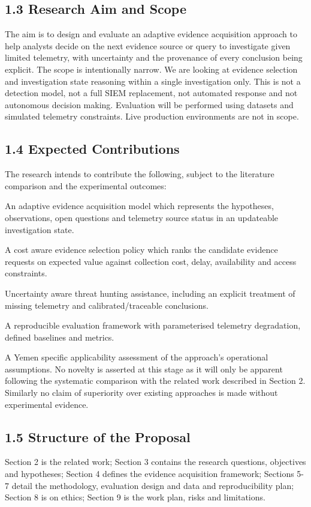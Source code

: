 \documentclass[a4paper,11pt]{article}
\begin{document}
\subsection{1.3 Research Aim and Scope}
The aim is to design and evaluate an adaptive evidence acquisition approach to help analysts decide on the next evidence source or query to investigate given limited telemetry, with uncertainty and the provenance of every conclusion being explicit. The scope is intentionally narrow. We are looking at evidence selection and investigation state reasoning within a single investigation only. This is not a detection model, not a full SIEM replacement, not automated response and not autonomous decision making. Evaluation will be performed using datasets and simulated telemetry constraints. Live production environments are not in scope.\par
\subsection{1.4 Expected Contributions}
The research intends to contribute the following, subject to the literature comparison and the experimental outcomes:\par
An adaptive evidence acquisition model which represents the hypotheses, observations, open questions and telemetry source status in an updateable investigation state.\par
A cost aware evidence selection policy which ranks the candidate evidence requests on expected value against collection cost, delay, availability and access constraints.\par
Uncertainty aware threat hunting assistance, including an explicit treatment of missing telemetry and calibrated/traceable conclusions.\par
A reproducible evaluation framework with parameterised telemetry degradation, defined baselines and metrics.\par
A Yemen specific applicability assessment of the approach's operational assumptions. No novelty is asserted at this stage as it will only be apparent following the systematic comparison with the related work described in Section 2. Similarly no claim of superiority over existing approaches is made without experimental evidence.\par
\subsection{1.5 Structure of the Proposal}
Section 2 is the related work; Section 3 contains the research questions, objectives and hypotheses; Section 4 defines the evidence acquisition framework; Sections 5-7 detail the methodology, evaluation design and data and reproducibility plan; Section 8 is on ethics; Section 9 is the work plan, risks and limitations.\par
\end{document}

